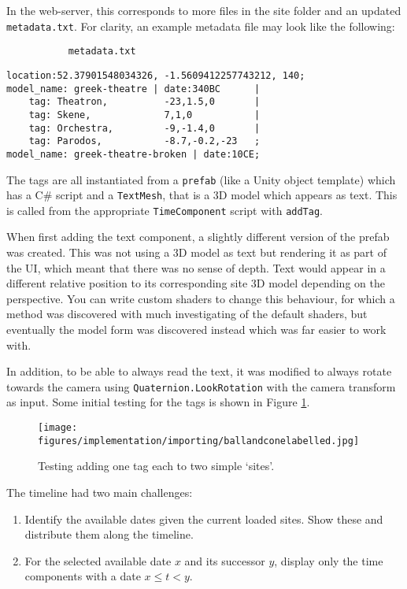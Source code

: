 \documentclass{article}
\begin{document}
In the web-server, this corresponds to more files in the site folder and an updated \verb|metadata.txt|. For clarity, an example metadata file may look like the following: 
\par
\verb|           metadata.txt|
\begin{mdframed}[leftmargin=50pt, rightmargin=50pt]
    \begin{verbatim}
location:52.37901548034326, -1.5609412257743212, 140;
model_name: greek-theatre | date:340BC      |
    tag: Theatron,          -23,1.5,0       |
    tag: Skene,             7,1,0           | 
    tag: Orchestra,         -9,-1.4,0       | 
    tag: Parodos,           -8.7,-0.2,-23   ;
model_name: greek-theatre-broken | date:10CE;\end{verbatim}
\end{mdframed}

The tags are all instantiated from a \verb|prefab| (like a Unity object template) which has a C\# script and a \verb|TextMesh|, that is a 3D model which appears as text. This is called from the appropriate \verb|TimeComponent| script with \verb|addTag|.

When first adding the text component, a slightly different version of the prefab was created. This was not using a 3D model as text but rendering it as part of the UI, which meant that there was no sense of depth. Text would appear in a different relative position to its corresponding site 3D model depending on the perspective. You can write custom shaders to change this behaviour, for which a method was discovered with much investigating of the default shaders, but eventually the model form was discovered instead which was far easier to work with. 

In addition, to be able to always read the text, it was modified to always rotate towards the camera using \verb|Quaternion.LookRotation| with the camera transform as input. Some initial testing for the tags is shown in Figure 
\ref{fig:ballconetag}.
\begin{figure}[h]
    \centering
    \texttt{[image: figures/implementation/importing/ballandconelabelled.jpg]}
        \caption{Testing adding one tag each to two simple `sites'.}
        \label{fig:ballconetag}
\end{figure}

The timeline had two main challenges:
\begin{enumerate}
    \item Identify the available dates given the current loaded sites. Show these and distribute them along the timeline.
    \item For the selected available date $x$ and its successor $y$, display only the time components with a date $x \leq t < y$.
\end{enumerate}
\end{document}

